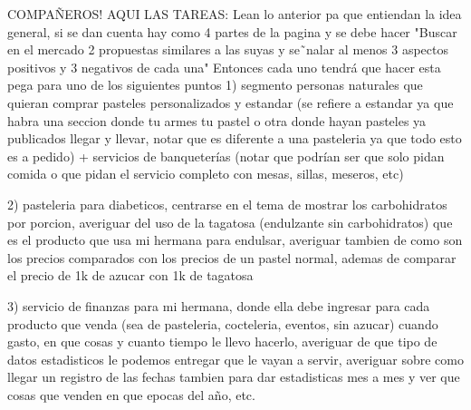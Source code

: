 \documentclass[preprintnumbers,superscriptaddress,amsmath,%
  amssymb,aps,reprint,nofootinbib]{revtex4-1}
\numberwithin{equation}{section}
\begin{document}
COMPAÑEROS! AQUI LAS TAREAS: Lean lo anterior pa que entiendan la idea general, si se dan cuenta hay como 4 partes de la pagina y se debe hacer "Buscar en el mercado 2 propuestas similares a las suyas y se˜nalar al menos 3 aspectos positivos
y 3 negativos de cada una" Entonces cada uno tendrá que hacer esta pega para uno de los siguientes puntos
1) segmento personas naturales que quieran comprar pasteles personalizados y estandar (se refiere a estandar ya que habra una seccion donde tu armes tu pastel o otra donde hayan pasteles ya publicados llegar y llevar, notar que es diferente a una pasteleria ya que todo esto es a pedido) + servicios de banqueterías (notar que podrían ser que solo pidan comida o que pidan el servicio completo con mesas, sillas, meseros, etc)

2) pasteleria para diabeticos, centrarse en el tema de mostrar los carbohidratos por porcion, averiguar del uso de la tagatosa (endulzante sin carbohidratos) que es el producto que usa mi hermana para endulsar, averiguar tambien de como son los precios comparados con los precios de un pastel normal, ademas de comparar el precio de 1k de azucar con 1k de tagatosa

3) servicio de finanzas para mi hermana, donde ella debe ingresar para cada producto que venda (sea de pasteleria, cocteleria, eventos, sin azucar) cuando gasto, en que cosas y cuanto tiempo le llevo hacerlo, averiguar de que tipo de datos estadisticos le podemos entregar que le vayan  a servir, averiguar sobre como llegar un registro de las fechas tambien para dar estadisticas mes a mes y ver que cosas que venden en que epocas del año, etc. 
\end{document}
